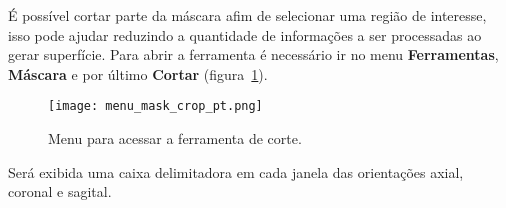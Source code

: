 É possível cortar parte da máscara afim de selecionar uma região de interesse, isso pode ajudar reduzindo a quantidade de informações a ser processadas ao gerar superfície. Para abrir a ferramenta é necessário ir no menu \textbf{Ferramentas}, \textbf{Máscara} e por último \textbf{Cortar} (figura~\ref{fig:menu_mask_crop}).

\begin{figure}[!htb]
\centering
\texttt{[image: menu\_mask\_crop\_pt.png]}
\caption{Menu para acessar a ferramenta de corte.}
\label{fig:menu_mask_crop}
\end{figure}

Será exibida uma caixa delimitadora em cada janela das orientações axial, coronal e sagital.
